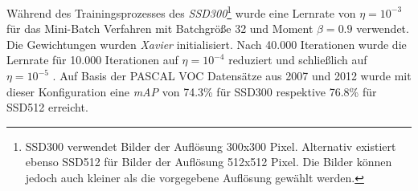 Während des Trainingsprozesses des \textit{SSD300}\footnote{SSD300 verwendet Bilder der Auflösung 300x300 Pixel. Alternativ existiert ebenso SSD512 für Bilder der Auflösung 512x512 Pixel. Die Bilder können jedoch auch kleiner als die vorgegebene Auflösung gewählt werden.} wurde eine Lernrate von $\eta = 10^{-3}$ für das Mini-Batch Verfahren mit Batchgröße 32 und Moment $\beta = 0.9$ verwendet. Die Gewichtungen wurden \textit{Xavier} initialisiert. Nach 40.000 Iterationen wurde die Lernrate für 10.000 Iterationen auf $\eta = 10^{-4}$ reduziert und schließlich auf $\eta = 10^{-5}$ \cite{ssd.20161229}. Auf Basis der PASCAL VOC Datensätze aus 2007 und 2012 wurde mit dieser Konfiguration eine \textit{mAP} von 74.3\% für SSD300 respektive 76.8\% für SSD512 erreicht.

